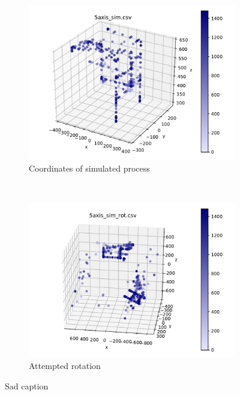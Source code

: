 \documentclass[english]{scrartcl}
\begin{document}
\begin{figure}
    \begin{subfigure}[t]{0.5\textwidth}
        \includegraphics[width=\textwidth]{sim.pdf}
        \caption{Coordinates of simulated process}
    \end{subfigure}%
    ~
    \begin{subfigure}[t]{0.5\textwidth}
        \includegraphics[width=\textwidth]{rot_sim.pdf}
        \caption{Attempted rotation}
    \end{subfigure}%

    \caption{Sad caption}
    \label{fig:rot}
\end{figure}
\end{document}
